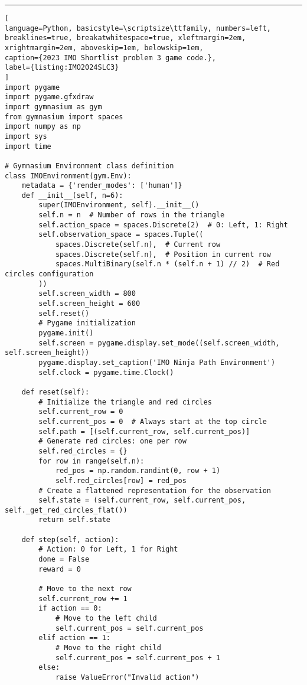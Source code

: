 \hrule
\begin{lstlisting}[
language=Python, basicstyle=\scriptsize\ttfamily, numbers=left, breaklines=true, breakatwhitespace=true, xleftmargin=2em, xrightmargin=2em, aboveskip=1em, belowskip=1em,
caption={2023 IMO Shortlist problem 3 game code.},
label={listing:IMO2024SLC3}
]
import pygame
import pygame.gfxdraw
import gymnasium as gym
from gymnasium import spaces
import numpy as np
import sys
import time

# Gymnasium Environment class definition
class IMOEnvironment(gym.Env):
    metadata = {'render_modes': ['human']}
    def __init__(self, n=6):
        super(IMOEnvironment, self).__init__()
        self.n = n  # Number of rows in the triangle
        self.action_space = spaces.Discrete(2)  # 0: Left, 1: Right
        self.observation_space = spaces.Tuple((
            spaces.Discrete(self.n),  # Current row
            spaces.Discrete(self.n),  # Position in current row
            spaces.MultiBinary(self.n * (self.n + 1) // 2)  # Red circles configuration
        ))
        self.screen_width = 800
        self.screen_height = 600
        self.reset()
        # Pygame initialization
        pygame.init()
        self.screen = pygame.display.set_mode((self.screen_width, self.screen_height))
        pygame.display.set_caption('IMO Ninja Path Environment')
        self.clock = pygame.time.Clock()
    
    def reset(self):
        # Initialize the triangle and red circles
        self.current_row = 0
        self.current_pos = 0  # Always start at the top circle
        self.path = [(self.current_row, self.current_pos)]
        # Generate red circles: one per row
        self.red_circles = {}
        for row in range(self.n):
            red_pos = np.random.randint(0, row + 1)
            self.red_circles[row] = red_pos
        # Create a flattened representation for the observation
        self.state = (self.current_row, self.current_pos, self._get_red_circles_flat())
        return self.state
    
    def step(self, action):
        # Action: 0 for Left, 1 for Right
        done = False
        reward = 0

        # Move to the next row
        self.current_row += 1
        if action == 0:
            # Move to the left child
            self.current_pos = self.current_pos
        elif action == 1:
            # Move to the right child
            self.current_pos = self.current_pos + 1
        else:
            raise ValueError("Invalid action")


\end{lstlisting}
